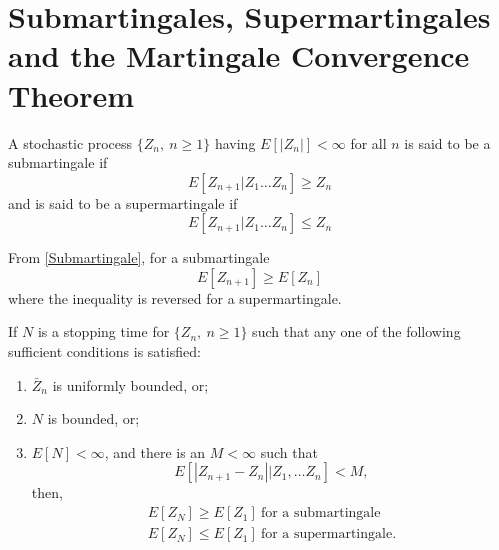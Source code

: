 \documentclass[a4paper,10pt,english]{article}
\begin{document}
\section{ Submartingales, Supermartingales and the Martingale Convergence Theorem}
\begin{defn}
A stochastic process $\{Z_n,~  n \geq 1\}$ having $E[|Z_n|]< \infty$ for all $n$ is said to be a submartingale if
\begin{equation}
\label{Submartingale}
E[Z_{n+1}|Z_1 \hdots Z_n] \geq Z_n
\end{equation}
and is said to be a supermartingale if
\begin{equation}
\label{Supermartingale}
E[Z_{n+1}|Z_1 \hdots Z_n] \leq Z_n
\end{equation}
\end{defn}
From \ref{Submartingale}, for a submartingale
\begin{equation*}
E[Z_{n+1}] \geq E[Z_n]
\end{equation*}
where the inequality is reversed for a supermartingale. 
\begin{thm}
\label{Stoppingtime_theorem}
If $N$ is a stopping time for $\{Z_n,~ n\geq 1\}$ such that any one of the following sufficient conditions is satisfied:
\begin{enumerate}
\item $\bar{Z}_n$ is uniformly bounded, or;
\item $N$ is bounded, or;
\item $E[N]< \infty$, and there is an $M < \infty$ such that
\begin{equation*}
E[|Z_{n+1}-Z_n| |Z_1, \hdots Z_n]<M,
\end{equation*}
then,
\begin{eqnarray*}
E[Z_N] \geq E[Z_1] ~ \text {for a submartingale}\\
E[Z_N] \leq E[Z_1] ~ \text {for a supermartingale}.
\end{eqnarray*}
\end{enumerate}
\end{thm}
\end{document}
